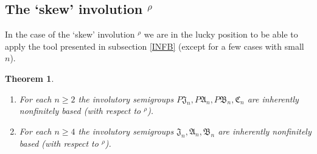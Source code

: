 \documentclass[preprint,1p,times]{elsarticle}
\numberwithin{equation}{section}
\newtheorem{Thm}{Theorem}[section]
\theoremstyle{remark}
\def\A{\mathfrak{A}}
\def\C{\mathfrak{C}}
\def\B{\mathfrak{B}}
\def\J{\mathfrak{J}}
\begin{document}
\subsection{The `skew' involution $^\rho$}

In the case of the `skew' involution $^\rho$ we are in the lucky position to be able to apply  the tool presented in
subsection \ref{INFB} (except for a few cases with small $n$).

\begin{Thm}
\begin{enumerate}
\item For each $n\ge 2$ the involutory semigroups $P\J_n,P\A_n,P\B_n,\C_n$ are inherently nonfinitely based (with respect to $^\rho$).
\item For each $n\ge 4$ the involutory semigroups $\J_n,\A_n,\B_n$ are inherently nonfinitely based (with respect to $^\rho$).
\end{enumerate}
\end{Thm}
\end{document}
